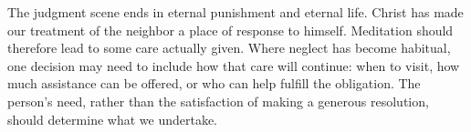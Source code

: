 The judgment scene ends in eternal punishment and eternal life. Christ has made our treatment of the neighbor a place of response to himself. Meditation should therefore lead to some care actually given. Where neglect has become habitual, one decision may need to include how that care will continue: when to visit, how much assistance can be offered, or who can help fulfill the obligation. The person's need, rather than the satisfaction of making a generous resolution, should determine what we undertake.

